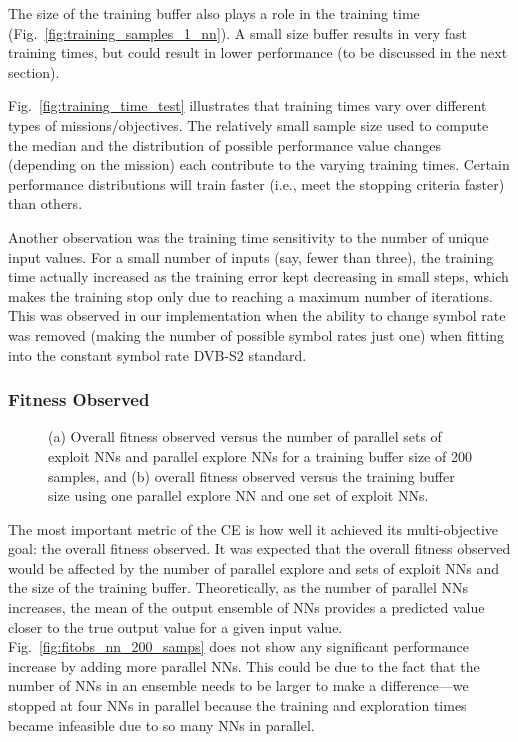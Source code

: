 \documentclass[journal]{IEEEtran}
\let\MYoriglatexcaption\caption
\renewcommand{\caption}[2][\relax]{\MYoriglatexcaption[#2]{#2}}
\begin{document}
The size of the training buffer also plays a role in the training time (Fig.~\ref{fig:training_samples_1_nn}).  A small size buffer results in very fast training times, but could result in lower performance (to be discussed in the next section).

Fig.~\ref{fig:training_time_test} illustrates that training times vary over different types of missions/objectives.  The relatively small sample size used to compute the median and the distribution of possible performance value changes (depending on the mission) each contribute to the varying training times.  Certain performance distributions will train faster (i.e., meet the stopping criteria faster) than others.

Another observation was the training time sensitivity to the number of unique input values.  For a small number of inputs (say, fewer than three), the training time actually increased as the training error kept decreasing in small steps, which makes the training stop only due to reaching a maximum number of iterations.  This was observed in our implementation when the ability to change symbol rate was removed (making the number of possible symbol rates just one) when fitting into the constant symbol rate DVB-S2 standard.

\subsubsection{Fitness Observed}
\begin{figure*}[t]
	\centering
 	\hfill
 	\caption{(a) Overall fitness observed versus the number of parallel sets of exploit NNs and parallel explore NNs for a training buffer size of 200 samples, and (b) overall fitness observed versus the training buffer size using one parallel explore NN and one set of exploit NNs.}
\end{figure*}

The most important metric of the CE is how well it achieved its multi-objective goal: the overall fitness observed.  It was expected that the overall fitness observed would be affected by the number of parallel explore and sets of exploit NNs and the size of the training buffer.  Theoretically, as the number of parallel NNs increases, the mean of the output ensemble of NNs provides a predicted value closer to the true output value for a given input value.  Fig.~\ref{fig:fitobs_nn_200_samps} does not show any significant performance increase by adding more parallel NNs.  This could be due to the fact that the number of NNs in an ensemble needs to be larger to make a difference---we stopped at four NNs in parallel because the training and exploration times became infeasible due to so many NNs in parallel.
\end{document}
